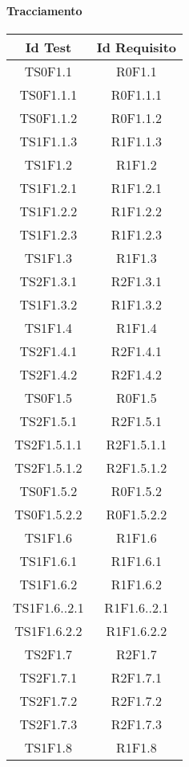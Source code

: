     \paragraph{Tracciamento} \Spazio
    
    \begin{longtable}{|c|c|}
    	\hline
    	\textbf{Id Test} & \textbf{Id Requisito}\\
    	\hline
    	\endhead
    	TS0F1.1&R0F1.1\\ \hline
    	TS0F1.1.1&R0F1.1.1 \\ \hline
    	TS0F1.1.2&R0F1.1.2 \\ \hline
    	TS1F1.1.3&R1F1.1.3 \\ \hline
    	TS1F1.2&R1F1.2 \\ \hline
    	TS1F1.2.1&R1F1.2.1 \\ \hline
    	TS1F1.2.2&R1F1.2.2 \\ \hline
    	TS1F1.2.3&R1F1.2.3 \\ \hline
    	TS1F1.3&R1F1.3 \\ \hline
    	TS2F1.3.1&R2F1.3.1 \\ \hline
    	TS1F1.3.2&R1F1.3.2 \\ \hline
    	TS1F1.4&R1F1.4 \\ \hline
    	TS2F1.4.1&R2F1.4.1 \\ \hline
    	TS2F1.4.2&R2F1.4.2 \\ \hline
    	TS0F1.5&R0F1.5 \\ \hline
    	TS2F1.5.1&R2F1.5.1 \\ \hline
    	TS2F1.5.1.1&R2F1.5.1.1 \\ \hline
    	TS2F1.5.1.2&R2F1.5.1.2 \\ \hline
    	TS0F1.5.2&R0F1.5.2 \\ \hline
    	TS0F1.5.2.2&R0F1.5.2.2 \\ \hline
    	TS1F1.6&R1F1.6 \\ \hline
    	TS1F1.6.1&R1F1.6.1 \\ \hline
    	TS1F1.6.2&R1F1.6.2 \\ \hline
    	TS1F1.6..2.1&R1F1.6..2.1 \\ \hline
    	TS1F1.6.2.2&R1F1.6.2.2 \\ \hline
    	TS2F1.7&R2F1.7 \\ \hline
    	TS2F1.7.1&R2F1.7.1 \\ \hline
    	TS2F1.7.2&R2F1.7.2 \\ \hline
    	TS2F1.7.3&R2F1.7.3 \\ \hline
    	TS1F1.8&R1F1.8 \\ \hline

\end{longtable}
